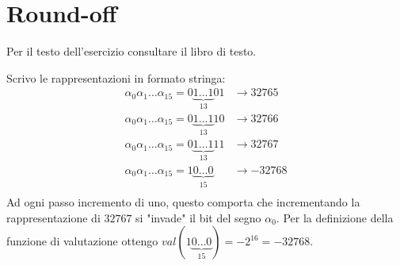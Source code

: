 \section{Round-off}

\begin{exercise}[1.5]
Per il testo dell'esercizio consultare il libro di testo.
\end{exercise}
Scrivo le rappresentazioni in formato stringa:
\begin{displaymath}
	\begin{split}
		\alpha_{0}\alpha_{1}\ldots\alpha_{15} = 0\underbrace{1\ldots1}_{13}01 & 
			\rightarrow  32765 \\
		\alpha_{0}\alpha_{1}\ldots\alpha_{15} = 0\underbrace{1\ldots1}_{13}10 & 
			\rightarrow  32766 \\
		\alpha_{0}\alpha_{1}\ldots\alpha_{15} = 0\underbrace{1\ldots1}_{13}11 & 
			\rightarrow  32767 \\
		\alpha_{0}\alpha_{1}\ldots\alpha_{15} = 1\underbrace{0\ldots0}_{15} & 
			\rightarrow  -32768 \\
	\end{split}
\end{displaymath}
Ad ogni passo incremento di uno, questo comporta che incrementando la rappresentazione
di $32767$ si "invade" il bit del segno $\alpha_{0}$. Per la definizione della funzione di 
valutazione ottengo $val(1\underbrace{0\ldots0}_{15}) = -2^{16} = -32768$.

